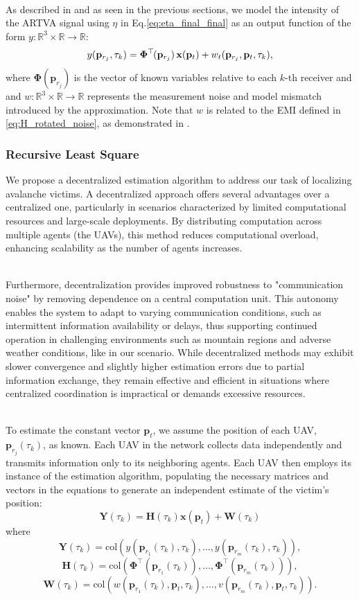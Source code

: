 \documentclass[main]{subfiles}
\begin{document}
\noindent\\
As described in \cite{similar-main} and as seen in the previous sections, 
we model the intensity of the ARTVA signal using $\eta$ in Eq.\ref{eq:eta_final_final} 
as an output function of the form \( y : \mathbb{R}^3 \times \mathbb{R} \rightarrow \mathbb{R} \):
\[
y(\mathbf{p}_{r_j}, \tau_k) = \mathbf{\Phi}^\top\mkern-2mu(\mathbf{p}_{r_j}) \, \mathbf{x}(\mathbf{p}_t) + 
w_t(\mathbf{p}_{r_j}, \mathbf{p}_t, \tau_k),
\]
where $\mathbf{\Phi}(\mathbf{p}_{r_j})$ is the vector of known variables
relative to each $k$-th receiver and 
and \( w : \mathbb{R}^3 \times \mathbb{R} \rightarrow \mathbb{R} \) 
represents the measurement noise and model 
mismatch introduced by the approximation.
Note that $w$ is related to the EMI defined in \ref{eq:H_rotated_noise}, as demonstrated in \cite{similar-main}.

\subsubsection{Recursive Least Square}
We propose a decentralized estimation algorithm to address our task of localizing avalanche 
victims. A decentralized approach offers several advantages over a centralized one, particularly 
in scenarios characterized by limited computational resources and large-scale deployments. 
By distributing computation across multiple agents (the UAVs), this method reduces computational 
overload, enhancing scalability as the number of agents increases.

\noindent\\
Furthermore, decentralization provides improved robustness to "communication noise" by removing 
dependence on a central computation unit. This autonomy enables the system to adapt to varying 
communication conditions, such as intermittent information availability or delays, thus supporting 
continued operation in challenging environments such as mountain regions and adverse weather 
conditions, like in our scenario. While decentralized methods may exhibit slower convergence and slightly higher estimation 
errors due to partial information exchange, they remain effective and efficient in situations where 
centralized coordination is impractical or demands excessive resources.

\noindent\\
To estimate the constant vector \( \mathbf{p}_t \), we assume the position of each 
UAV, \( \mathbf{p}_{r_j}(\tau_k) \), as known. 
Each UAV in the network collects data independently and transmits information only 
to its neighboring agents. Each UAV then employs its instance of the estimation 
algorithm, populating the necessary matrices and vectors in the equations to 
generate an independent estimate of the victim’s position:
\[
\mathbf{Y}(\tau_k) = \mathbf{H}(\tau_k) \mathbf{x}(\mathbf{p}_t) + \mathbf{W}(\tau_k)
\]
where
\[
\mathbf{Y}(\tau_k) = \mathrm{col}(y(\mathbf{p}_{r_1}(\tau_k), \tau_k), \ldots, y(\mathbf{p}_{r_m}(\tau_k), \tau_k)),
\]
\[
\mathbf{H}(\tau_k) = \mathrm{col}(\mathbf{\Phi}^\top(\mathbf{p}_{r_1}(\tau_k)), \ldots, \mathbf{\Phi}^\top(\mathbf{p}_{r_m}(\tau_k))),
\]
\[
\mathbf{W}(\tau_k) = \mathrm{col}(w(\mathbf{p}_{r_1}(\tau_k),\mathbf{p}_t, \tau_k), \ldots, v(\mathbf{p}_{r_m}(\tau_k), \mathbf{p}_t, \tau_k)).
\]
\end{document}
